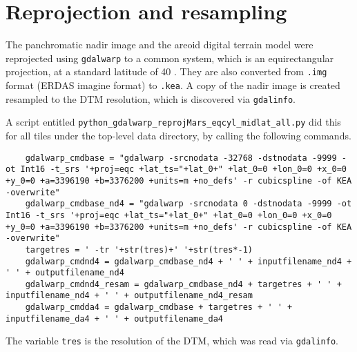 \documentclass[a4paper,12pt]{article}
\begin{document}
\section{Reprojection and resampling}
The panchromatic nadir image and the areoid digital terrain model were reprojected using {\tt gdalwarp} to a common system, which is an equirectangular projection, at a standard latitude of 40 \textdegree. They are also converted from {\tt .img} format (ERDAS imagine format) to {\tt .kea}. A copy of the nadir image is created resampled to the DTM resolution, which is discovered via {\tt gdalinfo}.

A script entitled {\tt python\_gdalwarp\_reprojMars\_eqcyl\_midlat\_all.py} did this for all tiles under the top-level data directory, by calling the following commands. 
\begin{verbatim}
 	gdalwarp_cmdbase = "gdalwarp -srcnodata -32768 -dstnodata -9999 -ot Int16 -t_srs '+proj=eqc +lat_ts="+lat_0+" +lat_0=0 +lon_0=0 +x_0=0 +y_0=0 +a=3396190 +b=3376200 +units=m +no_defs' -r cubicspline -of KEA -overwrite"
	gdalwarp_cmdbase_nd4 = "gdalwarp -srcnodata 0 -dstnodata -9999 -ot Int16 -t_srs '+proj=eqc +lat_ts="+lat_0+" +lat_0=0 +lon_0=0 +x_0=0 +y_0=0 +a=3396190 +b=3376200 +units=m +no_defs' -r cubicspline -of KEA -overwrite"
	targetres = ' -tr '+str(tres)+' '+str(tres*-1)
	gdalwarp_cmdnd4 = gdalwarp_cmdbase_nd4 + ' ' + inputfilename_nd4 + ' ' + outputfilename_nd4
	gdalwarp_cmdnd4_resam = gdalwarp_cmdbase_nd4 + targetres + ' ' + inputfilename_nd4 + ' ' + outputfilename_nd4_resam
	gdalwarp_cmdda4 = gdalwarp_cmdbase + targetres + ' ' + inputfilename_da4 + ' ' + outputfilename_da4
\end{verbatim}
The variable {\tt tres} is the resolution of the DTM, which was read via {\tt gdalinfo}.
\end{document}
